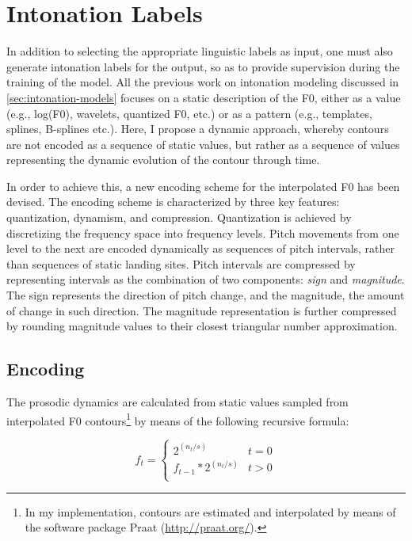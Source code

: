 
\section{Intonation Labels}\label{sec:f0-encoding}

In addition to selecting the appropriate linguistic labels as input, one must also generate intonation labels for the output, so as to provide supervision during the training of the model.
All the previous work on intonation modeling discussed in \autoref{sec:intonation-models} focuses on a static description of the \ac{F0}, either as a value (e.g., log(\ac{F0}), wavelets, quantized \ac{F0}, etc.) or as a pattern (e.g., templates, splines, B-splines etc.).
Here, I propose a dynamic approach, whereby contours are not encoded as a sequence of static values, but rather as a sequence of values representing the dynamic evolution of the contour through time.

In order to achieve this, a new encoding scheme for the interpolated \ac{F0} has been devised.
The encoding scheme is characterized by three key features: quantization, dynamism, and compression.
Quantization is achieved by discretizing the frequency space into frequency levels.
Pitch movements from one level to the next are encoded dynamically as sequences of pitch intervals, rather than sequences of static landing sites.
Pitch intervals are compressed by representing intervals as the combination of two components: \emph{sign} and \emph{magnitude}.
The sign represents the direction of pitch change, and the magnitude, the amount of change in such direction.
The magnitude representation is further compressed by rounding magnitude values to their closest triangular number approximation.



\subsection{Encoding}

The prosodic dynamics are calculated from static values sampled from interpolated \ac{F0} contours\footnote{In my implementation, contours are estimated and interpolated by means of the software package Praat (\url{http://praat.org/}).} by means of the following recursive formula:



\begin{equation}
    f_{t} = \left\{
    \begin{array}{ll}
      2^{(n_{t}/s)} & t=0 \\
      f_{t-1} * 2^{(n_{t}/s)} & t>0\\
    \end{array}
    \right.
\label{eq:frequency-equation}
\end{equation}

